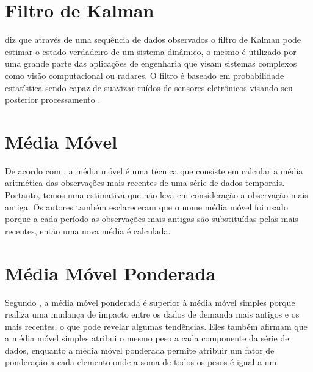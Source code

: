 \section{ Filtro de Kalman}
\cite{tan2005sensoclean} diz que através de uma sequência de dados observados o filtro de Kalman pode estimar o estado verdadeiro de um sistema dinâmico, o mesmo é utilizado por uma grande parte das aplicações de engenharia que visam sistemas complexos como visão computacional ou radares. O filtro é baseado em probabilidade estatística sendo capaz de suavizar ruídos de sensores eletrônicos visando seu posterior processamento \cite{International_Conference__Zhuang}.
 

\section{Média Móvel}
De acordo com \cite{santos2021educaccao}, a média móvel é uma técnica que consiste em calcular a média aritmética das observações mais recentes de uma série de dados temporais. Portanto, temos uma estimativa que não leva em consideração a observação mais antiga. Os autores também esclareceram que o nome média móvel foi usado porque a cada período as observações mais antigas são substituídas pelas mais recentes, então uma nova média é calculada.


\section{Média Móvel Ponderada}
Segundo \cite{ribeiro2020analise}, a média móvel ponderada é superior à média móvel simples porque realiza uma mudança de impacto entre os dados de demanda mais antigos e os mais recentes, o que pode revelar algumas tendências. Eles também afirmam que a média móvel simples atribui o mesmo peso a cada componente da série de dados, enquanto a média móvel ponderada permite atribuir um fator de ponderação a cada elemento onde a soma de todos os pesos é igual a um.




